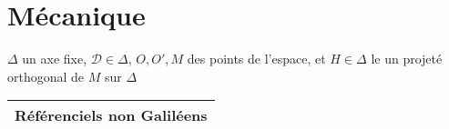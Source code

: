 \documentclass[10pt,a4paper,titlepage,landscape]{article}
\author{Quentin Lavigne}
\title{}
\renewcommand{\arraystretch}{2}
\begin{document}
\fancyhead{}
\pagestyle{fancy}


\tableofcontents

\section{Mécanique}

$\Delta$ un axe fixe, $\mathcal{D} \in \Delta$, $O, O', M$ des points de l'espace, et $H \in \Delta$ le un projeté orthogonal de $M$ sur $\Delta$

\begin{table}[H]
    \centering
    \renewcommand{\arraystretch}{1.5} %
    \setlength{\tabcolsep}{8pt} %
    \begin{tabular}{@{}|p{9cm}|p{10cm}@{}|}

        \multicolumn{2}{c}{\textbf{Référenciels non Galiléens}} \\ \hline


\end{tabular}
\end{table}
\end{document}
